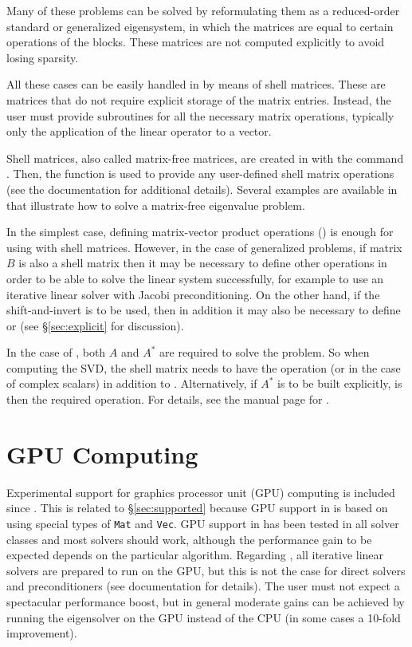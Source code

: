 	Many of these problems can be solved by reformulating them as a reduced-order standard or generalized eigensystem, in which the matrices are equal to certain operations of the blocks. These matrices are not computed explicitly to avoid losing sparsity.

	All these cases can be easily handled in \slepc by means of shell matrices. These are matrices that do not require explicit storage of the matrix entries. Instead, the user must provide subroutines for all the necessary matrix operations, typically only the application of the linear operator to a vector.

	Shell matrices, also called matrix-free matrices, are created in \petsc with the command . Then, the function  is used to provide any user-defined shell matrix operations (see the \petsc{} documentation for additional details). Several examples are available in \slepc that illustrate how to solve a matrix-free eigenvalue problem.

	In the simplest case, defining matrix-vector product operations () is enough for using  with shell matrices. However, in the case of generalized problems, if matrix $B$ is also a shell matrix then it may be necessary to define other operations in order to be able to solve the linear system successfully, for example  to use an iterative linear solver with Jacobi preconditioning. On the other hand, if the shift-and-invert  is to be used, then in addition it may also be necessary to define  or  (see \S\ref{sec:explicit} for discussion).

	In the case of , both $A$ and $A^*$ are required to solve the problem. So when computing the SVD, the shell matrix needs to have the  operation (or  in the case of complex scalars) in addition to . Alternatively, if $A^*$ is to be built explicitly,  is then the required operation. For details, see the manual page for .

\section{GPU Computing}
\label{sec:gpu}

Experimental support for graphics processor unit (GPU) computing is included since . This is related to \S\ref{sec:supported} because GPU support in \petsc is based on using special types of \texttt{Mat} and \texttt{Vec}. GPU support in \slepc has been tested in all solver classes and most solvers should work, although the performance gain to be expected depends on the particular algorithm. Regarding \petsc, all iterative linear solvers are prepared to run on the GPU, but this is not the case for direct solvers and preconditioners (see \petsc documentation for details). The user must not expect a spectacular performance boost, but in general moderate gains can be achieved by running the eigensolver on the GPU instead of the CPU (in some cases a 10-fold improvement).

